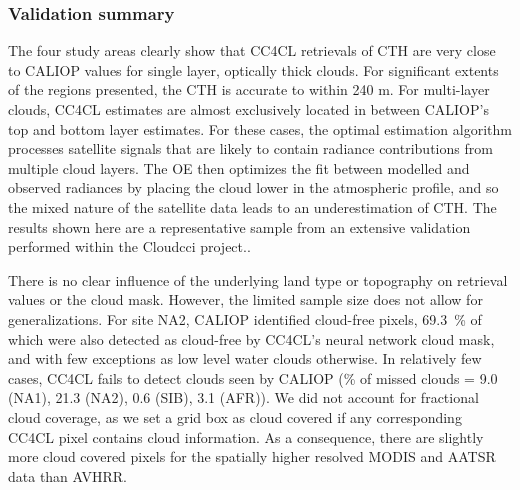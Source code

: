 \subsubsection{Validation summary}

The four study areas clearly show that CC4CL retrievals of CTH are very close to CALIOP values for single layer, optically thick clouds. For significant extents of the regions presented, the CTH is accurate to within 240 m. For multi-layer clouds, CC4CL estimates are almost exclusively located in between CALIOP's top and bottom layer estimates. For these cases, the optimal estimation algorithm processes satellite signals that are likely to contain radiance contributions from multiple cloud layers. The OE then optimizes the fit between modelled and observed radiances by placing the cloud lower in the atmospheric profile, and so the mixed nature of the satellite data leads to an underestimation of CTH. The results shown here are a representative sample from an extensive validation performed within the Cloud\textunderscore cci project..%

There is no clear influence of the underlying land type or topography on retrieval values or the cloud mask. However, the limited sample size does not allow for generalizations. For site NA2, CALIOP identified cloud-free pixels, 69.3~\% of which were also detected as cloud-free by CC4CL's neural network cloud mask, and with few exceptions as low level water clouds otherwise. In relatively few cases, CC4CL fails to detect clouds seen by CALIOP (\% of missed clouds = 9.0 (NA1), 21.3 (NA2), 0.6 (SIB), 3.1 (AFR)). We did not account for fractional cloud coverage, as we set a grid box as cloud covered if any corresponding CC4CL pixel contains cloud information. As a consequence, there are slightly more cloud covered pixels for the spatially higher resolved MODIS and AATSR data than AVHRR.

